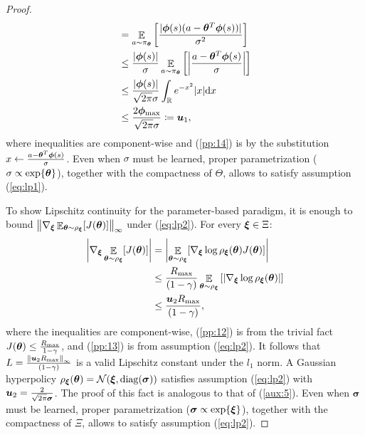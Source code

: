 \begin{proof}
\begin{align}
		&=\Exp_{a\sim\pi_{\vtheta}}\left[\frac{|\vphi(s)(a-\vtheta^T\vphi(s))|}{\sigma^2}\right] \nonumber\\
		&\leq \frac{|\vphi(s)|}{\sigma}\Exp_{a\sim\pi_{\vtheta}}\left[\left|\frac{a-\vtheta^T\vphi(s)}{\sigma}\right|\right] \nonumber\\
		&\leq \frac{|\vphi(s)|}{\sqrt{2\pi}\sigma}\int_{\Reals} e^{-x^2}|x|\de x \label{pp:14}\\
		& \leq  \frac{2\vphi_{\max}}{\sqrt{2\pi}\sigma}\coloneqq \vu_1, \label{aux:5}
	\end{align}
	where inequalities are component-wise and (\ref{pp:14}) is by the substitution $x\gets \frac{a-\vtheta^T\vphi(s)}{\sigma}$. Even when $\sigma$ must be learned, proper parametrization (\eg $\sigma\propto\exp\{\vtheta\}$), together with the compactness of $\Theta$, allows to satisfy assumption (\ref{eq:lp1}).
	
	To show Lipschitz continuity for the parameter-based paradigm, it is enough to bound $\norm[\infty]{\nabla_{\vxi}\Exp_{\vtheta\sim\rho_{\vxi}}[J(\vtheta)]}$ under (\ref{eq:lp2}). For every $\vxi\in\Xi$:
	\begin{align}
		\left|\nabla_{\vxi}\Exp_{\vtheta\sim\rho_{\vxi}}[J(\vtheta)]\right| &=
		\left|\Exp_{\vtheta\sim\rho_{\vxi}}[\nabla_{\vxi}\log\rho_{\vxi}(\vtheta)J(\vtheta)]\right| \nonumber\\
		&\leq \frac{\Rmax}{(1-\gamma)}\Exp_{\vtheta\sim\rho_{\vxi}}\left[\left|\nabla_{\vxi}\log\rho_{\vxi}(\vtheta)\right|\right] \label{pp:12} \\
		&\leq \frac{\vu_2\Rmax}{(1-\gamma)} \label{pp:13},
	\end{align}
	where the inequalities are component-wise, (\ref{pp:12}) is from the trivial fact $J(\vtheta)\leq\frac{\Rmax}{1-\gamma}$, and (\ref{pp:13}) is from assumption (\ref{eq:lp2}).
	It follows that $L=\frac{\norm[\infty]{\vu_2\Rmax}}{(1-\gamma)}$ is a valid Lipschitz constant under the $l_1$ norm.
	 A Gaussian hyperpolicy $\rho_{\vxi}(\vtheta) = \mathcal{N}(\vxi,\mathrm{diag}(\boldsymbol{\sigma}))$ satisfies assumption (\ref{eq:lp2}) with $\vu_2 = \frac{2}{\sqrt{2\pi}\boldsymbol{\sigma}}$. The proof of this fact is analogous to that of (\ref{aux:5}). Even when $\boldsymbol{\sigma}$ must be learned, proper parametrization (\eg $\boldsymbol{\sigma}\propto\exp\{\vxi\}$), together with the compactness of $\Xi$, allows to satisfy assumption (\ref{eq:lp2}).
\end{proof}

